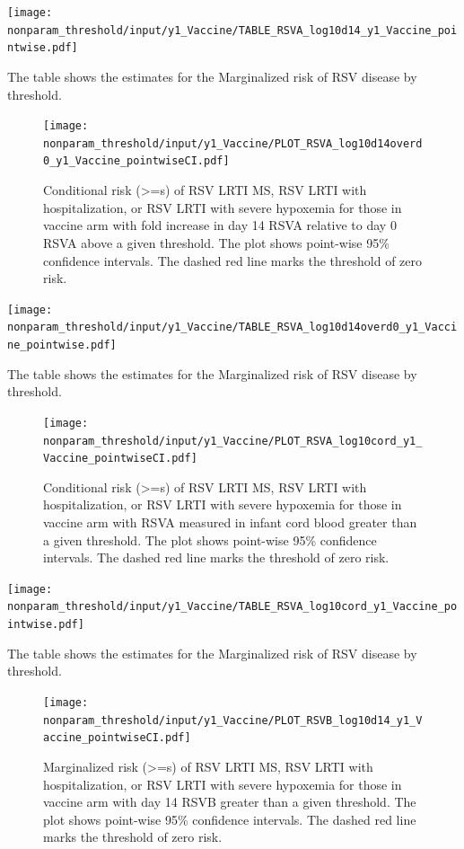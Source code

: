 \documentclass[11pt]{article}
\begin{document}
\begin{table}[H]
    \centering
    \texttt{[image: nonparam\_threshold/input/y1\_Vaccine/TABLE\_RSVA\_log10d14\_y1\_Vaccine\_pointwise.pdf]}
    \caption{The table shows the  estimates for the Marginalized risk of RSV disease by threshold. }
\end{table}

\begin{figure}[H]
    \centering
    \texttt{[image: nonparam\_threshold/input/y1\_Vaccine/PLOT\_RSVA\_log10d14overd0\_y1\_Vaccine\_pointwiseCI.pdf]}
    \caption{Conditional risk (>=s) of RSV LRTI MS, RSV LRTI with hospitalization, or RSV LRTI with severe hypoxemia for those in vaccine arm with fold increase in day 14 RSVA relative to day 0 RSVA above a given threshold. The plot shows point-wise 95\% confidence intervals. The dashed red line marks the threshold of zero risk.}
\end{figure}

\begin{table}[H]
    \centering
    \texttt{[image: nonparam\_threshold/input/y1\_Vaccine/TABLE\_RSVA\_log10d14overd0\_y1\_Vaccine\_pointwise.pdf]}
    \caption{The table shows the  estimates for the Marginalized risk of RSV disease by threshold. }
\end{table}

\begin{figure}[H]
    \centering
    \texttt{[image: nonparam\_threshold/input/y1\_Vaccine/PLOT\_RSVA\_log10cord\_y1\_Vaccine\_pointwiseCI.pdf]}
   \caption{Conditional risk (>=s) of RSV LRTI MS, RSV LRTI with hospitalization, or RSV LRTI with severe hypoxemia for those in vaccine arm with RSVA measured in infant cord blood greater than a given threshold. The plot shows point-wise 95\% confidence intervals. The dashed red line marks the threshold of zero risk.}
\end{figure}

\begin{table}[H]
    \centering
    \texttt{[image: nonparam\_threshold/input/y1\_Vaccine/TABLE\_RSVA\_log10cord\_y1\_Vaccine\_pointwise.pdf]}
    \caption{The table shows the  estimates for the Marginalized risk of RSV disease by threshold. }
\end{table}

\begin{figure}[H]
    \centering
    \texttt{[image: nonparam\_threshold/input/y1\_Vaccine/PLOT\_RSVB\_log10d14\_y1\_Vaccine\_pointwiseCI.pdf]}
   \caption{Marginalized risk (>=s) of RSV LRTI MS, RSV LRTI with hospitalization, or RSV LRTI with severe hypoxemia for those in vaccine arm with day 14 RSVB greater than a given threshold. The plot shows point-wise 95\% confidence intervals. The dashed red line marks the threshold of zero risk.}
      \label{tab:PLOT_RSVB_log10d14_y1_Vaccine_pointwiseCI.pdf}

\end{figure}
\end{document}
